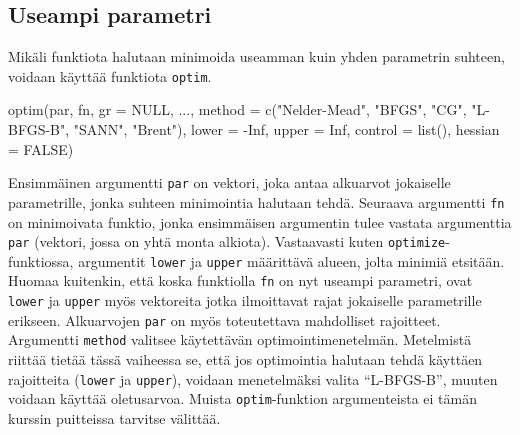 \documentclass[
]{book}
\newenvironment{Shaded}{\begin{snugshade}}{\end{snugshade}}
\newcommand{\AttributeTok}[1]{\textcolor[rgb]{0.77,0.63,0.00}{#1}}
\newcommand{\ConstantTok}[1]{\textcolor[rgb]{0.00,0.00,0.00}{#1}}
\newcommand{\FunctionTok}[1]{\textcolor[rgb]{0.00,0.00,0.00}{#1}}
\newcommand{\NormalTok}[1]{#1}
\newcommand{\SpecialCharTok}[1]{\textcolor[rgb]{0.00,0.00,0.00}{#1}}
\newcommand{\StringTok}[1]{\textcolor[rgb]{0.31,0.60,0.02}{#1}}
\begin{document}
\hypertarget{useampi-parametri}{%
\subsection{Useampi parametri}\label{useampi-parametri}}

Mikäli funktiota halutaan minimoida useamman kuin yhden parametrin suhteen, voidaan käyttää funktiota \texttt{optim}.

\begin{Shaded}
\begin{Highlighting}[]
\FunctionTok{optim}\NormalTok{(par, fn, }\AttributeTok{gr =} \ConstantTok{NULL}\NormalTok{, ...,}
      \AttributeTok{method =} \FunctionTok{c}\NormalTok{(}\StringTok{"Nelder{-}Mead"}\NormalTok{, }\StringTok{"BFGS"}\NormalTok{, }\StringTok{"CG"}\NormalTok{, }\StringTok{"L{-}BFGS{-}B"}\NormalTok{, }\StringTok{"SANN"}\NormalTok{,}
                 \StringTok{"Brent"}\NormalTok{),}
      \AttributeTok{lower =} \SpecialCharTok{{-}}\ConstantTok{Inf}\NormalTok{, }\AttributeTok{upper =} \ConstantTok{Inf}\NormalTok{,}
      \AttributeTok{control =} \FunctionTok{list}\NormalTok{(), }\AttributeTok{hessian =} \ConstantTok{FALSE}\NormalTok{)}
\end{Highlighting}
\end{Shaded}

Ensimmäinen argumentti \texttt{par} on vektori, joka antaa alkuarvot jokaiselle parametrille, jonka suhteen minimointia halutaan tehdä. Seuraava argumentti \texttt{fn} on minimoivata funktio, jonka ensimmäisen argumentin tulee vastata argumenttia \texttt{par} (vektori, jossa on yhtä monta alkiota). Vastaavasti kuten \texttt{optimize}-funktiossa, argumentit \texttt{lower} ja \texttt{upper} määrittävä alueen, jolta minimiä etsitään. Huomaa kuitenkin, että koska funktiolla \texttt{fn} on nyt useampi parametri, ovat \texttt{lower} ja \texttt{upper} myös vektoreita jotka ilmoittavat rajat jokaiselle parametrille erikseen. Alkuarvojen \texttt{par} on myös toteutettava mahdolliset rajoitteet. Argumentti \texttt{method} valitsee käytettävän optimointimenetelmän. Metelmistä riittää tietää tässä vaiheessa se, että jos optimointia halutaan tehdä käyttäen rajoitteita (\texttt{lower} ja \texttt{upper}), voidaan menetelmäksi valita ``L-BFGS-B'', muuten voidaan käyttää oletusarvoa. Muista \texttt{optim}-funktion argumenteista ei tämän kurssin puitteissa tarvitse välittää.
\end{document}
